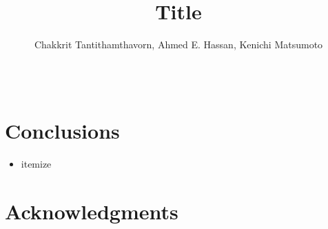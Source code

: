 


\newcommand{\rqi}{What is RQ1?}
\newcommand{\rqii}{What is RQ1?}



\title{Title}

\author{\alignauthor Chakkrit Tantithamthavorn, Ahmed E. Hassan, Kenichi Matsumoto \\
 \\ 
 \\
} 

\maketitle

\begin{abstract} 
\end{abstract}







\section{Conclusions}\label{sec:conclusions}


\begin{itemize}
\item itemize
\end{itemize}

\cite{Tantithamthavorn}

\section*{Acknowledgments}






